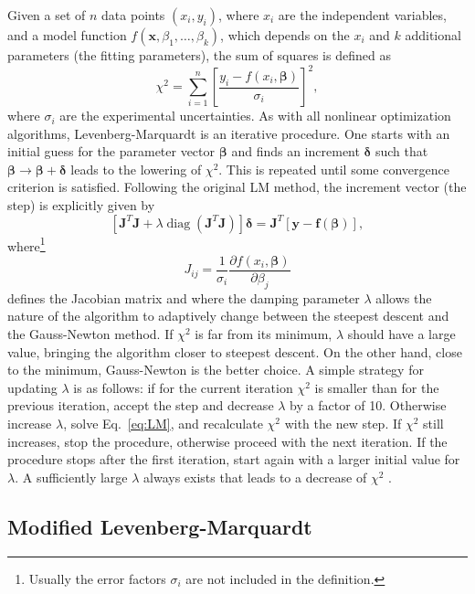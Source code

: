 \documentclass{article}
\DeclareMathOperator{\diag}{diag}
\begin{document}
Given a set of $n$ data points $(x_i,y_i)$, where $x_i$ are the independent variables, and a model function $f(\bm x, \beta_1, \ldots, \beta_k)$, which depends on the $x_i$ and $k$ additional parameters (the fitting parameters), the sum of squares is defined as
\begin{equation}
  \label{eq:chi2}
  \chi^2 = \sum_{i=1}^n \left[ \frac{y_i - f(x_i, \bm\beta)}{\sigma_i}
  \right]^2,
\end{equation}
where $\sigma_i$ are the experimental uncertainties. As with all nonlinear optimization algorithms, Levenberg-Marquardt is an iterative procedure. One starts with an initial guess for the parameter vector $\bm\beta$ and finds an increment $\bm\delta$ such that $\bm\beta \rightarrow \bm\beta + \bm\delta$ leads to the lowering of $\chi^2$. This is repeated until some convergence criterion is satisfied. Following the original LM method, the increment vector (the step) is explicitly given by
\begin{equation}
  \label{eq:LM}
  \left[\bm J^T \bm J + \lambda\diag \left(\bm J^T \bm J\right)
  \right] \bm\delta = \bm J^T \left[ \bm y - \bm f(\bm \beta) \right],
\end{equation}
where\footnote{Usually the error factors $\sigma_i$ are not included in the
  definition.}
\begin{equation}
  \label{eq:Jacob}
  J_{ij} = \frac{1}{\sigma_i} \frac{\partial f(x_i, \bm \beta)}
  {\partial \beta_j}
\end{equation}
defines the Jacobian matrix and where the damping parameter $\lambda$ allows the nature of the algorithm to adaptively change between the steepest descent and the Gauss-Newton method. If $\chi^2$ is far from its minimum, $\lambda$ should have a large value, bringing the algorithm closer to steepest descent. On the other hand, close to the minimum, Gauss-Newton is the better choice. A simple strategy for updating $\lambda$ is as follows: if for the current iteration $\chi^2$ is smaller than for the previous iteration, accept the step and decrease $\lambda$ by a factor of 10. Otherwise increase $\lambda$, solve Eq.~\eqref{eq:LM}, and recalculate $\chi^2$ with the new step. If $\chi^2$ still increases, stop the procedure, otherwise proceed with the next iteration. If the procedure stops after the first iteration, start again with a larger initial value for $\lambda$. A sufficiently large $\lambda$ always exists that leads to a decrease of $\chi^2$ \cite{marquardt63}.

\subsection{\label{sec:mod_lm}Modified Levenberg-Marquardt}
\end{document}
